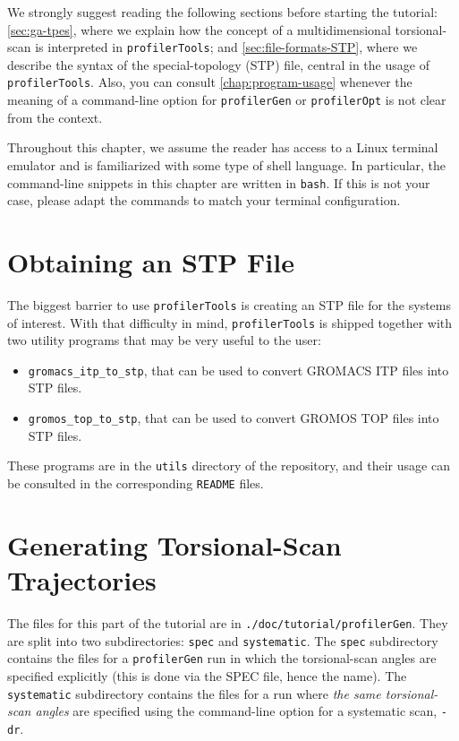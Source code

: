 \documentclass[10pt,a4paper,openany]{memoir}
\numberwithin{equation}{section}
\newcommand{\profileropt}[0]{\texttt{profilerOpt}}
\newcommand{\profilergen}[0]{\texttt{profilerGen}}
\newcommand{\profilertools}[0]{\texttt{profilerTools}}
\begin{document}
We strongly suggest reading the following sections before starting the tutorial:
\autoref{sec:ga-tpes}, where we explain how the concept of a multidimensional
torsional-scan is interpreted in \profilertools{}; and
\autoref{sec:file-formats-STP}, where we describe the syntax of the
special-topology (STP) file, central in the usage of \profilertools{}.  Also,
you can consult \autoref{chap:program-usage} whenever the meaning of a
command-line option for \profilergen{} or \profileropt{} is not clear from the
context.

Throughout this chapter, we assume the reader has access to a Linux
terminal emulator and is familiarized with some type of shell
language.
%
In particular, the command-line snippets in this chapter are written
in \texttt{bash}.
%
If this is not your case, please adapt the commands to match your
terminal configuration.

\section{Obtaining an STP File}
\label{sec:tutorial-utils}

The biggest barrier to use \profilertools{} is creating an STP file
for the systems of interest.  With that difficulty in mind,
\profilertools{} is shipped together with two utility programs that
may be very useful to the user:
\begin{itemize}
\item \texttt{gromacs\_itp\_to\_stp}, that can be used to convert GROMACS
  ITP files into STP files.
\item \texttt{gromos\_top\_to\_stp}, that can be used to convert GROMOS
  TOP files into STP files.
\end{itemize}
These programs are in the \texttt{utils} directory of the repository,
and their usage can be consulted in the corresponding \texttt{README}
files.

\section{Generating Torsional-Scan Trajectories}
\label{sec:tutorial-profilergen}

The files for this part of the tutorial are in
\texttt{./doc/tutorial/profilerGen}. They are split into two subdirectories:
\texttt{spec} and \texttt{systematic}.  The \texttt{spec} subdirectory contains
the files for a \profilergen{} run in which the torsional-scan angles are
specified explicitly (this is done via the SPEC file, hence the name).  The
\texttt{systematic} subdirectory contains the files for a run where \textit{the
  same torsional-scan angles} are specified using the command-line option for a
systematic scan, \texttt{-dr}.
\end{document}
